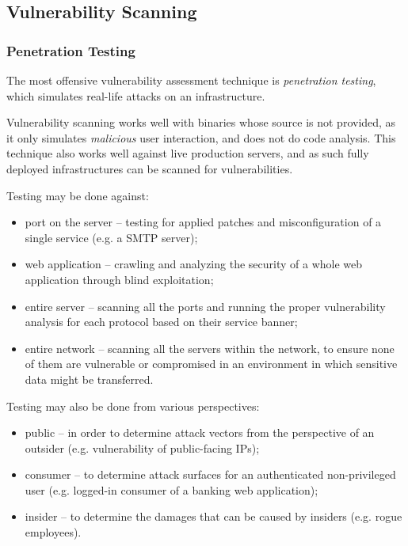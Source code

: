 \documentclass[a4paper,12pt]{article}
\begin{document}
\subsection{Vulnerability Scanning}
 
	
\subsubsection{Penetration Testing}
 
	
	The most offensive vulnerability assessment technique is \textit{penetration testing}, which simulates real-life attacks on an infrastructure.
	
	Vulnerability scanning works well with binaries whose source is not provided, as it only simulates \textit{malicious} user interaction, and does not do code analysis. This technique also works well against live production servers, and as such fully deployed infrastructures can be scanned for vulnerabilities.
	
	\noindent Testing may be done against:
	
	\begin{itemize}
		\item port on the server -- testing for applied patches and misconfiguration of a single service (e.g. a SMTP server);
		\item web application -- crawling and analyzing the security of a whole web application through blind exploitation;
		\item entire server -- scanning all the ports and running the proper vulnerability analysis for each protocol based on their service banner;
		\item entire network -- scanning all the servers within the network, to ensure none of them are vulnerable or compromised in an environment in which sensitive data might be transferred.
	\end{itemize}
	
	\noindent Testing may also be done from various perspectives:
	
	\begin{itemize}
		\item public -- in order to determine attack vectors from the perspective of an outsider (e.g. vulnerability of public-facing IPs);
		\item consumer -- to determine attack surfaces for an authenticated non-privileged user (e.g. logged-in consumer of a banking web application);
		\item insider -- to determine the damages that can be caused by insiders (e.g. rogue employees).
	\end{itemize}
	
\end{document}
